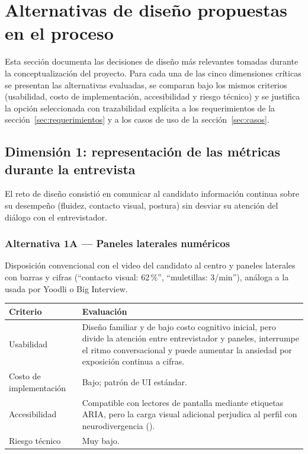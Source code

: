 \section{Alternativas de diseño propuestas en el proceso}
\label{sec:alternativas}

Esta sección documenta las decisiones de diseño más relevantes tomadas
durante la conceptualización del proyecto. Para cada una de las cinco
dimensiones críticas se presentan las alternativas evaluadas, se
comparan bajo los mismos criterios (usabilidad, costo de
implementación, accesibilidad y riesgo técnico) y se justifica la
opción seleccionada con trazabilidad explícita a los requerimientos
de la sección~\ref{sec:requerimientos} y a los casos de uso de la
sección~\ref{sec:casos}.

\subsection{Dimensión 1: representación de las métricas durante la entrevista}

El reto de diseño consistió en comunicar al candidato información
continua sobre su desempeño (fluidez, contacto visual, postura) sin
desviar su atención del diálogo con el entrevistador.

\subsubsection*{Alternativa 1A — Paneles laterales numéricos}
Disposición convencional con el video del candidato al centro y
paneles laterales con barras y cifras (``contacto visual: 62\,\%'',
``muletillas: 3/min''), análoga a la usada por Yoodli o Big Interview.

\begin{table}[ht]
\centering\footnotesize
\renewcommand{\arraystretch}{1.2}
\begin{tabularx}{\linewidth}{@{}p{3.6cm} Y@{}}
\toprule
\textbf{Criterio} & \textbf{Evaluación} \\
\midrule
Usabilidad & Diseño familiar y de bajo costo cognitivo inicial, pero
divide la atención entre entrevistador y paneles, interrumpe el ritmo
conversacional y puede aumentar la ansiedad por exposición continua a
cifras. \\
Costo de implementación & Bajo; patrón de UI estándar. \\
Accesibilidad & Compatible con lectores de pantalla mediante etiquetas
ARIA, pero la carga visual adicional perjudica al perfil con
neurodivergencia (). \\
Riesgo técnico & Muy bajo. \\
\bottomrule
\end{tabularx}
\end{table}

